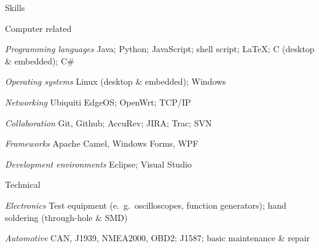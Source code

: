 \documentclass[letterpaper,12pt,oneside,compact]{article}
\begin{document}
\begin{heading}{Skills}
\begin{resitem}{Computer related}
\item \emph{Programming languages}\hspace*{10pt} Java; Python; JavaScript; shell script; \LaTeX{}; C (desktop \& embedded); C\#
\item \emph{Operating systems}\hspace*{10pt} Linux (desktop \& embedded); Windows
\item \emph{Networking}\hspace*{10pt} Ubiquiti EdgeOS; OpenWrt; TCP/IP
\item \emph{Collaboration}\hspace*{10pt} Git, Github; AccuRev; JIRA; Trac; SVN
\item \emph{Frameworks}\hspace*{10pt} Apache Camel, Windows Forms, WPF
\item \emph{Development environments}\hspace*{10pt} Eclipse; Visual Studio
\end{resitem}
\begin{resitem}{Technical}
	\item \emph{Electronics}\hspace*{10pt} Test equipment (e.\ g.\ oscilloscopes, function generators); hand soldering (through-hole \& SMD)
	\item \emph{Automotive}\hspace*{10pt} CAN, J1939, NMEA2000, OBD2; J1587; basic maintenance \& repair
\end{resitem}
\end{heading}

\end{document}
